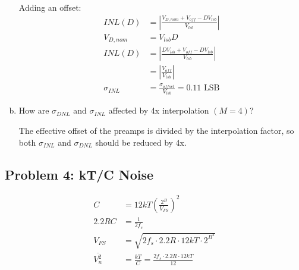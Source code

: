 \documentclass[11pt]{article}
\begin{document}
\begin{enumerate}[a)]
    Adding an offset:
    \begin{align*}
      INL(D) &= \left| \frac{V_{D,nom} + V_{off} - D V_{lsb}}{V_{lsb}} \right| \\
      V_{D,nom} &= V_{lsb} D \\
      INL(D) &= \left| \frac{D V_{lsb} + V_{off} - D V_{lsb}}{V_{lsb}} \right| \\
      &= \left| \frac{V_{off}}{V_{lsb}} \right| \\
      \sigma_{INL} &= \frac{\sigma_{offset}}{V_{lsb}} = 0.11 \text{ LSB}
    \end{align*}

  \item How are $\sigma_{DNL}$ and $\sigma_{INL}$ affected by 4x interpolation $(M = 4)$?

    The effective offset of the preamps is divided by the interpolation factor, so both $\sigma_{INL}$ and $\sigma_{DNL}$ should be reduced by 4x.
\end{enumerate}

\subsection*{Problem 4: kT/C Noise}

\begin{align*}
  C &= 12 kT \left( \frac{2^B}{V_{FS}} \right)^2 \\
  2.2 R C &= \frac{1}{2 f_s} \\
  V_{FS} &= \sqrt{2 f_s \cdot 2.2R \cdot 12 kT \cdot 2^{B^2}} \\
  \overline{V_{n}^2} &= \frac{k T}{C} = \frac{2 f_s \cdot 2.2R \cdot 12 kT}{12}
\end{align*}
\end{document}
